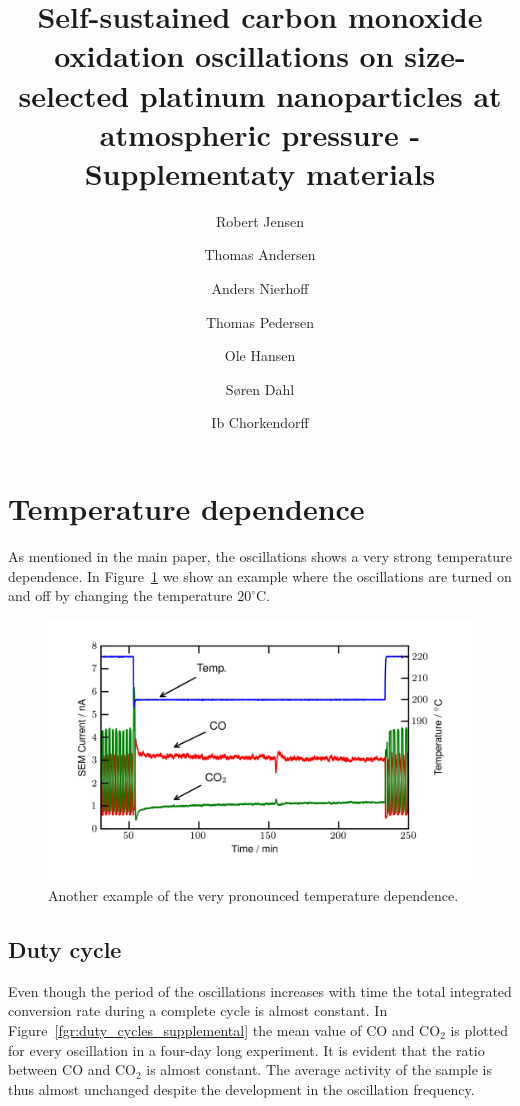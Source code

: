 \documentclass[journal=jacsat,manuscript=article]{achemso}
\author{Robert Jensen}
\author{Thomas Andersen}
\author{Anders Nierhoff}
\author{Thomas Pedersen}
\author{Ole Hansen}
\author{S\o ren Dahl}
\author{Ib Chorkendorff}
\title[Oxidation oscillations at atmospheric pressure]
{Self-sustained carbon monoxide oxidation oscillations on size-selected platinum nanoparticles at atmospheric pressure - Supplementaty materials}
\begin{document}
\section{Temperature dependence}
As mentioned in the main paper, the oscillations shows a very strong
temperature dependence. In Figure~\ref{fgr:temperature_dependence_supplemental}
we show an example where the oscillations are turned on and off by changing the
temperature $20^\circ$C.

\begin{figure}[h]
\centering
  \includegraphics[width=12cm]{temperature_dependence_supplemental.png}
  \caption{Another example of the very pronounced temperature dependence.}
  \label{fgr:temperature_dependence_supplemental}
\end{figure}

\subsection{Duty cycle}
Even though the period of the oscillations increases with time the total
integrated conversion rate during a complete cycle is almost constant. In
Figure~\ref{fgr:duty_cycles_supplemental} the mean value of CO and
CO$_2$ is plotted for every oscillation in a four-day long experiment. It is
evident that the ratio between CO and CO$_2$ is almost constant. The
average activity of the sample is thus almost unchanged despite the development in
the oscillation frequency.
\end{document}
